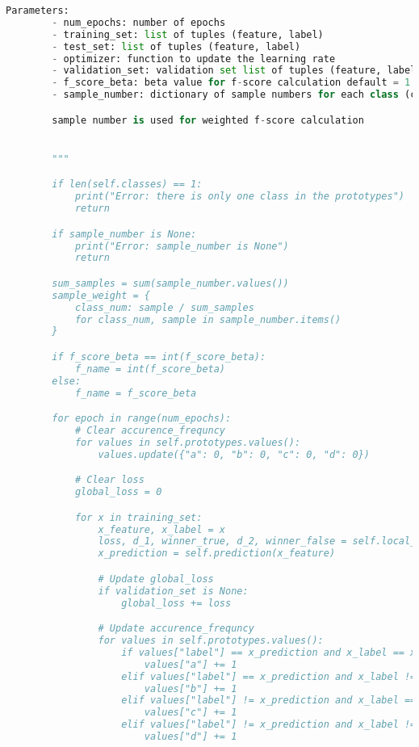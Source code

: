 \begin{lstlisting}[language=Python]
        Parameters:
        - num_epochs: number of epochs
        - training_set: list of tuples (feature, label)
        - test_set: list of tuples (feature, label)
        - optimizer: function to update the learning rate
        - validation_set: validation set list of tuples (feature, label)
        - f_score_beta: beta value for f-score calculation default = 1
        - sample_number: dictionary of sample numbers for each class (class_name: sample_number)

        sample number is used for weighted f-score calculation


        """

        if len(self.classes) == 1:
            print("Error: there is only one class in the prototypes")
            return

        if sample_number is None:
            print("Error: sample_number is None")
            return

        sum_samples = sum(sample_number.values())
        sample_weight = {
            class_num: sample / sum_samples
            for class_num, sample in sample_number.items()
        }

        if f_score_beta == int(f_score_beta):
            f_name = int(f_score_beta)
        else:
            f_name = f_score_beta

        for epoch in range(num_epochs):
            # Clear accurence_frequncy
            for values in self.prototypes.values():
                values.update({"a": 0, "b": 0, "c": 0, "d": 0})

            # Clear loss
            global_loss = 0

            for x in training_set:
                x_feature, x_label = x
                loss, d_1, winner_true, d_2, winner_false = self.local_loss(x)
                x_prediction = self.prediction(x_feature)

                # Update global_loss
                if validation_set is None:
                    global_loss += loss

                # Update accurence_frequncy
                for values in self.prototypes.values():
                    if values["label"] == x_prediction and x_label == x_prediction:
                        values["a"] += 1
                    elif values["label"] == x_prediction and x_label != x_prediction:
                        values["b"] += 1
                    elif values["label"] != x_prediction and x_label == x_prediction:
                        values["c"] += 1
                    elif values["label"] != x_prediction and x_label != x_prediction:
                        values["d"] += 1


\end{lstlisting}

